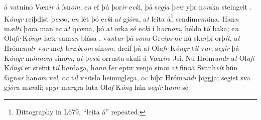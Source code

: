    á  vatnino Væn\textit{ir}  
  á ísn\textit{om}; e\textit{n} ef þú þor\textit{ir} e\textit{ck}i, þá s\textit{egja} þ\textit{ei}r yþr  n\textit{or}ska   steingeit   . 
 K\textit{óngr} reiþdist þ\textit{ess}o, e\textit{n} lét þó e\textit{ck}i a\textit{t} g\textit{jỏr}a, 
 a\textit{t} leita á\footnote{Dittography in L679, \enquote{leita á} repeated.}  sendim\textit{enn}ina. 
 Han\textit{n} m\textit{ælti} þ\textit{or}a man e\textit{c} a\textit{t} q\textit{vo}ma, 
 þó a\textit{t} orka sé e\textit{ck}i  í h\textit{or}n\textit{om}, héldo   t\textit{il} baka; 
 e\textit{n} Ol\textit{afr} K\textit{óngr} lætr sam\textit{an} 
 blása  , v\textit{an}t\textit{ar} þá s\textit{onu} Gr\textit{eips} o\textit{c}  nú   sk\textit{ar}þí orþ\textit{it}, 
 a\textit{t} Hróm\textit{undr} v\textit{ar}  m\textit{eþ} b\textit{ræþ}r\textit{om} sín\textit{om}; 
 dreif þá a\textit{t} Ol\textit{afr} K\textit{óngr}  t\textit{il} v\textit{ar}, s\textit{egir} þá K\textit{óngr}
m\textit{ỏnnom} sín\textit{om}, a\textit{t} þ\textit{ess}i orrusta skuli   á Væn\textit{ir}s Jsi. 
Nú   Hróm\textit{undr} a\textit{t} Ol\textit{afi} K\textit{óngi} er stefnt
t\textit{il} b\textit{ar}daga, h\textit{ann} f\textit{er} eptir 
venjo sin\textit{n}i a\textit{t} fin\textit{n}a Svanh\textit{vít} hún
fagn\textit{ar} han\textit{om} v\textit{el}, 
o\textit{c}  t\textit{il} v\textit{ei}tslo heimugl\textit{e}ga, 
o\textit{c} biþr Hróm\textit{undi} þiggja;  
 segist  sva g\textit{jỏr}a m\textit{un}di;  
 sp\textit{yr} m\textit{ar}gra luta   Ol\textit{af} K\textit{óng} 
hún s\textit{egir}  h\textit{ann} sé 
